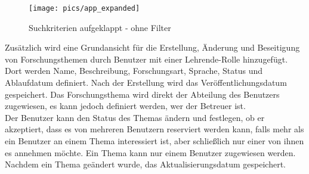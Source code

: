 \cleardoublepage
\begin{figure}[hp]%
    \centering
    \texttt{[image: pics/app\_expanded]}\\
    \caption{Suchkriterien aufgeklappt - ohne Filter}
\end{figure}

\cleardoublepage
Zusätzlich wird eine Grundansicht für die Erstellung, Änderung und Beseitigung von Forschungsthemen durch Benutzer mit einer Lehrende-Rolle hinzugefügt. Dort werden Name, Beschreibung, Forschungsart, Sprache, Status und Ablaufdatum definiert. Nach der Erstellung wird das Veröffentlichungsdatum gespeichert.
Das Forschungsthema wird direkt der Abteilung des Benutzers zugewiesen, es kann jedoch definiert werden, wer der Betreuer ist.\\

Der Benutzer kann den Status des Themas ändern und festlegen, ob er akzeptiert, dass es von mehreren Benutzern reserviert werden kann, falls mehr als ein Benutzer an einem Thema interessiert ist, aber schließlich nur einer von ihnen es annehmen möchte. Ein Thema kann nur einem Benutzer zugewiesen werden.
Nachdem ein Thema geändert wurde, das Aktualisierungsdatum gespeichert.